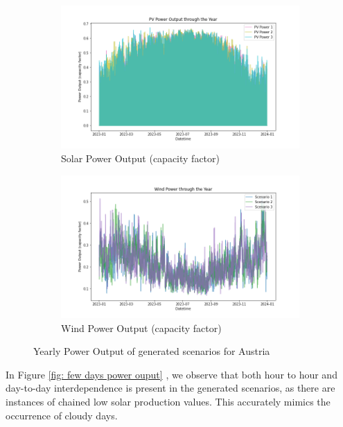\documentclass[english]{article}
\numberwithin{definition}{section}
\numberwithin{theorem}{section}
\numberwithin{problem}{section}
\begin{document}
\begin{figure}[H]
\centering
\begin{subfigure}{.45\textwidth}
  \centering
  \includegraphics[width=\linewidth]{immagini/scenarios/PV_power_output_year.png}
  \caption{Solar Power Output (capacity factor)}
  \label{fig:PV year}
\end{subfigure}%
\quad
\begin{subfigure}{.45\textwidth}
  \centering
  \includegraphics[width=\linewidth]{immagini/scenarios/wind_power_output_year.png}
  \caption{Wind Power Output (capacity factor)}
  \label{fig:wind year}
\end{subfigure}
\caption{Yearly Power Output of generated scenarios for Austria}
\label{fig: year power output}
\end{figure}

In Figure \ref{fig: few days power ouput} , we observe that both hour to hour and day-to-day interdependence is present in the generated scenarios, as there are instances of chained low solar production values. This accurately mimics the occurrence of cloudy days.
\end{document}
